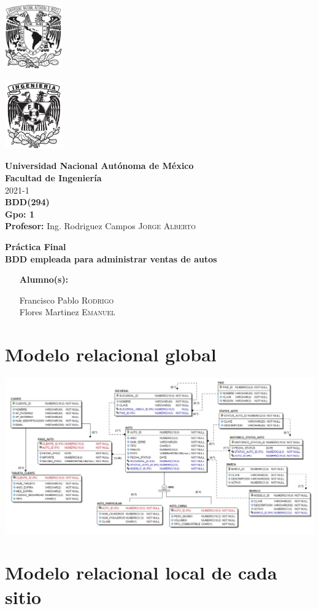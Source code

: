 \documentclass{article}
\newcommand{\coverPage}{
\thispagestyle{empty}
  \begin{minipage}[t][5cm][t]{0.2\linewidth}
    \includegraphics[width=2.5cm]{unam.jpg}

    \vspace{10cm}

    \includegraphics[width=2.5cm]{fiblack}
  \end{minipage}
  \begin{minipage}[t]{0.7\linewidth}
    \vspace{-2.5cm}
    \LARGE{\textbf{\university}}\\
    \Large{\textbf{\faculty}} \\
  
    \large{\semestre}\\[2cm]
  
    \large{\textbf{\materia (\clave)}}\\
    \large{\textbf{Gpo: \grupo}}\\[5mm]
    \large{\textbf{Profesor:} \profesor}\\ [1.5cm]
    \begin{center}
        \LARGE{\textbf{\actividad}}\\
        \LARGE{\textbf{\titulo}}\\
    \end{center}
  
    \vspace{3.3cm}
  
    \large{
      \begin{itemize}[ noitemsep, align=left ]
        \item [\textbf{Alumno(s):}] 
          \begin{flushright}
            \alumno
          \end{flushright}
      \end{itemize}
    } \vspace{1.5cm}
  
    \begin{flushright}
        \fechaEntrega%
    \end{flushright}
  \end{minipage}

\newpage
}
\begin{document}

\newcommand{\university}{Universidad Nacional Autónoma de México}
\newcommand{\faculty}{Facultad de Ingeniería}
\newcommand{\semestre}{2021-1}
\newcommand{\materia}{BDD}
\newcommand{\clave}{294}
\newcommand{\grupo}{1}
\newcommand{\profesor}{Ing. Rodriguez Campos \textsc{Jorge Alberto}}

\newcommand{\alumno}{
  Francisco Pablo \textsc{Rodrigo} \\ 
  Flores Martinez \textsc{Emanuel}   
}
\newcommand{\actividad}{Práctica Final}
\newcommand{\titulo}{BDD empleada para administrar ventas de autos}

\newcommand{\fechaEntrega}{}

\newcommand{\codedir}{codigo}
\graphicspath{{assets/}{bdd_proyecto.assets/}{modelo}}

\coverPage%



\section*{Modelo relacional global}

\includegraphics[width=\linewidth]{modelo}\\

\section*{Modelo relacional local de cada sitio}
\end{document}

